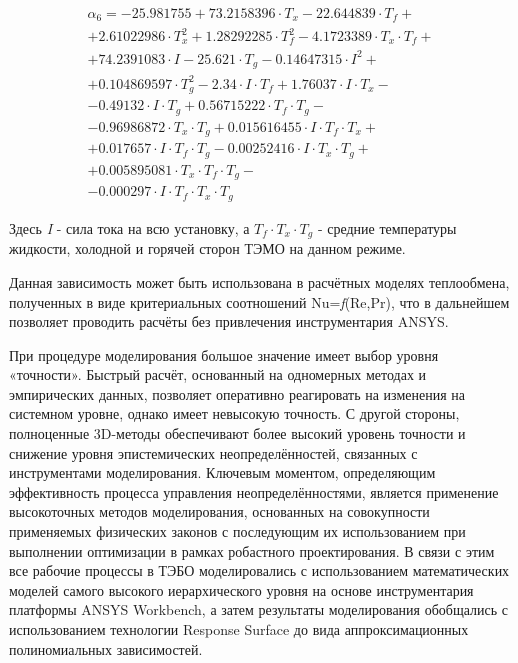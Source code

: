 \[
	\begin{array}{l}
		\alpha _{6} =-25.981755+73.2158396\cdot T_{x} -22.644839\cdot T_{f}+
		\\+
		2.61022986\cdot T_{x}^{2} + 1.28292285\cdot T_{f}^{2} -4.1723389\cdot T_{x} \cdot T_{f} +
		\\+
		74.2391083\cdot I-25.621\cdot T_{g} -0.14647315\cdot I^{2} +
		\\+
		0.104869597\cdot T_{g}^{2} -2.34\cdot I\cdot T_{f} +
		1.76037\cdot I\cdot T_{x} -
		\\-
		0.49132\cdot I\cdot T_{g} +
		0.56715222\cdot T_{f} \cdot T_{g} -
		\\-
		0.96986872\cdot T_{x} \cdot T_{g} +
		0.015616455\cdot I\cdot T_{f} \cdot T_{x} +
		\\+
		0.017657\cdot I\cdot T_{f} \cdot T_{g} -
		0.00252416\cdot I\cdot T_{x} \cdot T_{g} +
		\\+
		0.005895081\cdot T_{x} \cdot T_{f} \cdot T_{g} -
		\\-
		0.000297\cdot I\cdot T_{f} \cdot T_{x} \cdot T_{g}
	\end{array}
\]

Здесь \textit{I} - сила тока на всю установку, а $T_{f} \cdot T_{x} \cdot T_{g} $ - средние температуры жидкости, холодной и горячей сторон ТЭМО на данном режиме.

Данная зависимость может быть использована в расчётных моделях теплообмена,
полученных в виде критериальных соотношений Nu=\textit{f}(Re,Pr),
что в дальнейшем позволяет проводить расчёты без привлечения инструментария ANSYS.

При процедуре моделирования большое значение имеет выбор уровня «точности». Быстрый расчёт, основанный на одномерных методах и эмпирических данных, позволяет оперативно реагировать на изменения на системном уровне, однако имеет невысокую точность. С другой стороны, полноценные 3D-методы обеспечивают более высокий уровень точности и снижение уровня эпистемических неопределённостей, связанных с инструментами моделирования. Ключевым моментом, определяющим эффективность процесса управления неопределённостями, является применение высокоточных методов моделирования, основанных на совокупности применяемых физических законов с последующим их использованием при выполнении оптимизации в рамках робастного проектирования. В связи с этим все рабочие процессы в ТЭБО моделировались с использованием математических моделей самого высокого иерархического уровня на основе инструментария платформы ANSYS Workbench, а затем результаты моделирования обобщались с использованием технологии Response Surface до вида аппроксимационных полиномиальных зависимостей.

